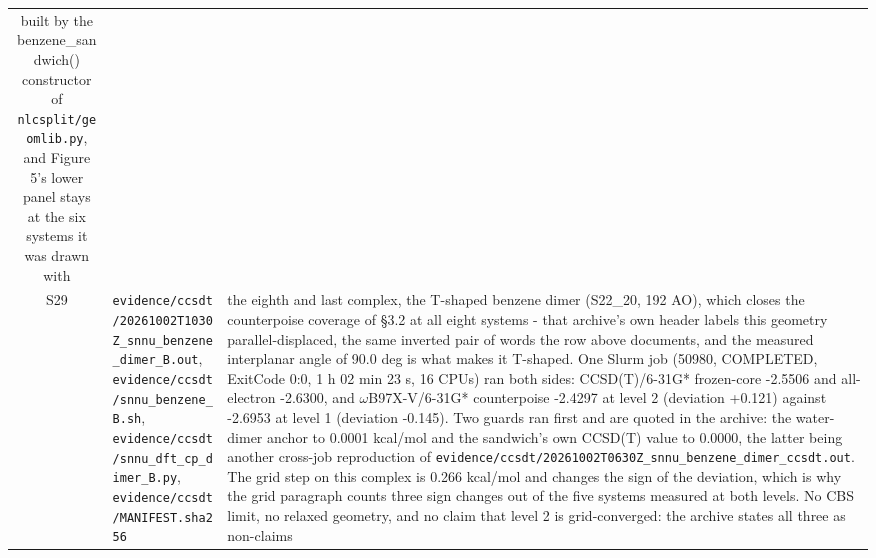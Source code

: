 \documentclass[11pt]{article}
\begin{document}
\begin{longtable}{c>{\raggedright\arraybackslash}p{}>{\raggedright\arraybackslash}p{}}
built by the benzene\_sandwich() constructor of \texttt{nlcsplit/geomlib.py}, and Figure 5's lower panel stays at the six systems it was drawn with \\
S29 & \texttt{evidence/\allowbreak{}ccsdt/\allowbreak{}20261002T1030Z\_\allowbreak{}snnu\_\allowbreak{}benzene\_\allowbreak{}dimer\_\allowbreak{}B.out}, \texttt{evidence/\allowbreak{}ccsdt/\allowbreak{}snnu\_\allowbreak{}benzene\_\allowbreak{}B.sh}, \texttt{evidence/\allowbreak{}ccsdt/\allowbreak{}snnu\_\allowbreak{}dft\_\allowbreak{}cp\_\allowbreak{}dimer\_\allowbreak{}B.py}, \texttt{evidence/\allowbreak{}ccsdt/\allowbreak{}MANIFEST.sha256} & the eighth and last complex, the T-shaped benzene dimer (S22\_20, 192 AO), which closes the counterpoise coverage of \S{}3.2 at all eight systems - that archive's own header labels this geometry parallel-displaced, the same inverted pair of words the row above documents, and the measured interplanar angle of 90.0 deg is what makes it T-shaped. One Slurm job (50980, COMPLETED, ExitCode 0:0, 1 h 02 min 23 s, 16 CPUs) ran both sides: CCSD(T)/6-31G* frozen-core -2.5506 and all-electron -2.6300, and $\omega$B97X-V/6-31G* counterpoise -2.4297 at level 2 (deviation +0.121) against -2.6953 at level 1 (deviation -0.145). Two guards ran first and are quoted in the archive: the water-dimer anchor to 0.0001 kcal/mol and the sandwich's own CCSD(T) value to 0.0000, the latter being another cross-job reproduction of \texttt{evidence/\allowbreak{}ccsdt/\allowbreak{}20261002T0630Z\_\allowbreak{}snnu\_\allowbreak{}benzene\_\allowbreak{}dimer\_\allowbreak{}ccsdt.out}. The grid step on this complex is 0.266 kcal/mol and changes the sign of the deviation, which is why the grid paragraph counts three sign changes out of the five systems measured at both levels. No CBS limit, no relaxed geometry, and no claim that level 2 is grid-converged: the archive states all three as non-claims \\

\end{longtable}
\end{document}

